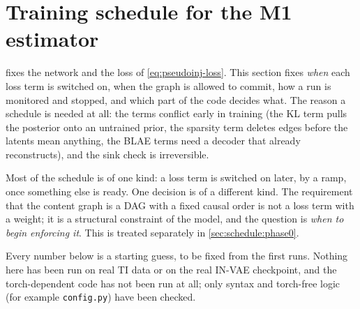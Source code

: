 \section{Training schedule for the M1 estimator}
\label{sec:schedule}

 fixes the network and the loss of \cref{eq:pseudoinj-loss}. This
section fixes \emph{when} each loss term is switched on, when the graph is allowed to
commit, how a run is monitored and stopped, and which part of the code decides what.
The reason a schedule is needed at all: the terms conflict early in training (the KL
term pulls the posterior onto an untrained prior, the sparsity term deletes edges
before the latents mean anything, the BLAE terms need a decoder that already
reconstructs), and the sink check is irreversible.

Most of the schedule is of one kind: a loss term is switched on later, by a ramp, once
something else is ready. One decision is of a different kind. The requirement that the
content graph is a DAG with a fixed causal order is not a loss term with a weight; it
is a structural constraint of the model, and the question is \emph{when to begin
enforcing it}. This is treated separately in \cref{sec:schedule:phase0}.

Every number below is a starting guess, to be fixed from the first runs. Nothing here
has been run on real TI data or on the real IN-VAE checkpoint, and the torch-dependent
code has not been run at all; only syntax and torch-free logic (for example
\texttt{config.py}) have been checked.

